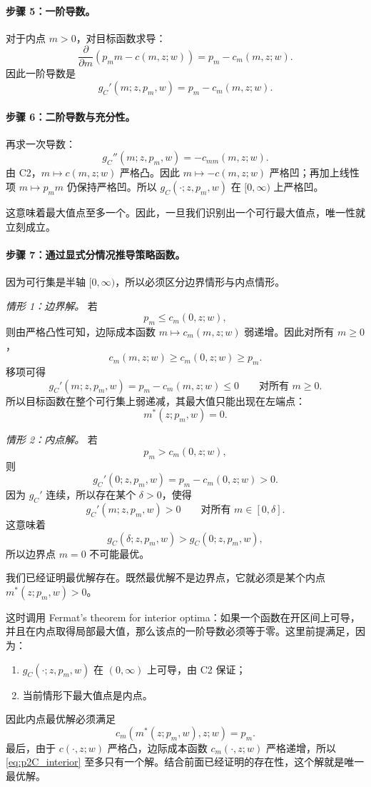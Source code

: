 \paragraph{步骤 5：一阶导数。}
对于内点 $m>0$，对目标函数求导：
\[
\frac{\partial}{\partial m}\left(p_m m-c(m,z;w)\right)=p_m-c_m(m,z;w).
\]
因此一阶导数是
\begin{equation}
g_C'(m;z,p_m,w)=p_m-c_m(m,z;w).
\label{eq:p2C_derivative}
\end{equation}

\paragraph{步骤 6：二阶导数与充分性。}
再求一次导数：
\[
g_C''(m;z,p_m,w)=-c_{mm}(m,z;w).
\]
由 C2，$m\mapsto c(m,z;w)$ 严格凸。因此 $m\mapsto -c(m,z;w)$ 严格凹；再加上线性项 $m\mapsto p_m m$ 仍保持严格凹。所以 $g_C(\cdot;z,p_m,w)$ 在 $[0,\infty)$ 上严格凹。

这意味着最大值点至多一个。因此，一旦我们识别出一个可行最大值点，唯一性就立刻成立。

\paragraph{步骤 7：通过显式分情况推导策略函数。}
因为可行集是半轴 $[0,\infty)$，所以必须区分边界情形与内点情形。

\textit{情形 1：边界解。}
若
\[
p_m\le c_m(0,z;w),
\]
则由严格凸性可知，边际成本函数 $m\mapsto c_m(m,z;w)$ 弱递增。因此对所有 $m\ge 0$，
\[
c_m(m,z;w)\ge c_m(0,z;w)\ge p_m.
\]
移项可得
\[
g_C'(m;z,p_m,w)=p_m-c_m(m,z;w)\le 0
\qquad\text{对所有 }m\ge 0.
\]
所以目标函数在整个可行集上弱递减，其最大值只能出现在左端点：
\begin{equation}
m^*(z;p_m,w)=0.
\label{eq:p2C_boundary}
\end{equation}

\textit{情形 2：内点解。}
若
\[
p_m>c_m(0,z;w),
\]
则
\[
g_C'(0;z,p_m,w)=p_m-c_m(0,z;w)>0.
\]
因为 $g_C'$ 连续，所以存在某个 $\delta>0$，使得
\[
g_C'(m;z,p_m,w)>0
\qquad\text{对所有 }m\in[0,\delta].
\]
这意味着
\[
g_C(\delta;z,p_m,w)>g_C(0;z,p_m,w),
\]
所以边界点 $m=0$ 不可能最优。

我们已经证明最优解存在。既然最优解不是边界点，它就必须是某个内点 $m^*(z;p_m,w)>0$。

这时调用 Fermat's theorem for interior optima：如果一个函数在开区间上可导，并且在内点取得局部最大值，那么该点的一阶导数必须等于零。这里前提满足，因为：
\begin{enumerate}
    \item $g_C(\cdot;z,p_m,w)$ 在 $(0,\infty)$ 上可导，由 C2 保证；
    \item 当前情形下最大值点是内点。
\end{enumerate}
因此内点最优解必须满足
\begin{equation}
c_m(m^*(z;p_m,w),z;w)=p_m.
\label{eq:p2C_interior}
\end{equation}
最后，由于 $c(\cdot,z;w)$ 严格凸，边际成本函数 $c_m(\cdot,z;w)$ 严格递增，所以 \eqref{eq:p2C_interior} 至多只有一个解。结合前面已经证明的存在性，这个解就是唯一最优解。


